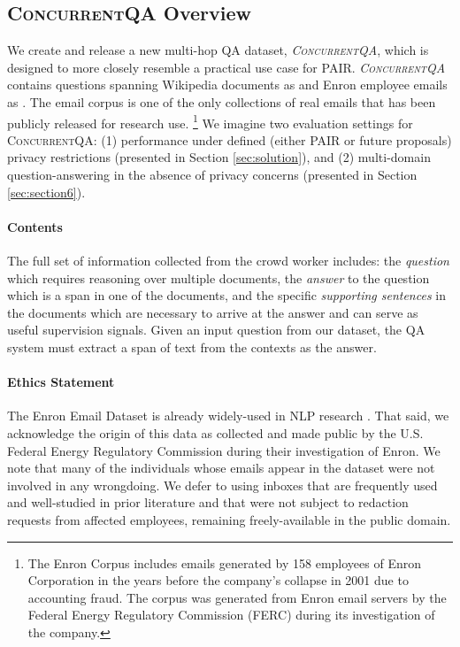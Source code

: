 \documentclass{article}
\renewcommand\cite{\citep}	\newcommand\shortcite{\citeyearpar}\newcommand\newcite{\citet}
\newcommand{\datasetname}{\textsc{ConcurrentQA}\xspace}
\newcommand{\problemshortname}{\textsc{PAIR}\xspace}
\begin{document}
\subsection{\datasetname Overview} 
We create and release a new multi-hop QA dataset, \textit{\datasetname}, which is designed to more closely resemble a practical use case for \problemshortname. \textit{\datasetname} contains 
questions spanning Wikipedia documents as  and Enron employee emails \cite{klimt2004enron} as . The email corpus is one of the only collections of real emails that has been publicly released for research use. \footnote{The Enron Corpus includes emails generated by 158 employees of Enron Corporation in the years before the company's collapse in 2001 due to accounting fraud. The corpus was generated from Enron email servers by the Federal Energy Regulatory Commission (FERC) during its investigation of the company.} We imagine two evaluation settings for \datasetname: (1) performance under defined (either \problemshortname or future proposals) privacy restrictions (presented in Section \ref{sec:solution}), and (2) 
multi-domain question-answering in the absence of privacy concerns
(presented in Section \ref{sec:section6}). 


\paragraph{Contents} The full set of information collected from the crowd worker includes: the \textit{question} which requires reasoning over multiple documents, the \textit{answer} to the question which is a span in one of the documents, and the specific \textit{supporting sentences} in the documents which are necessary to arrive at the answer and can serve as useful supervision signals. Given an input question from our dataset, the QA system must extract a span of text from the contexts as the answer. 

\paragraph{Ethics Statement} The Enron Email Dataset is already widely-used in NLP research \cite{heller2017enronnyt}. That said, we acknowledge the origin of this data as collected and made public by the U.S. Federal Energy Regulatory Commission during their investigation of Enron. We note that many of the individuals whose emails appear in the dataset were not involved in any wrongdoing. We defer to using inboxes that are frequently used and well-studied in prior literature and that were not subject to redaction requests from affected employees, remaining freely-available in the public domain.
\end{document}
